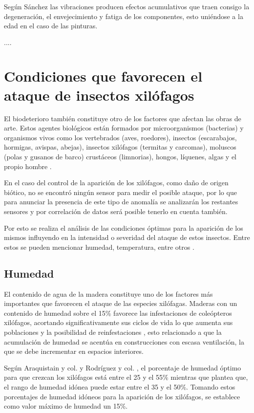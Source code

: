     Según Sánchez \cite{sanchezPinturaSobreTabla2015} las vibraciones producen efectos acumulativos que traen consigo la degeneración, el envejecimiento y fatiga de los componentes, esto uniéndose a la edad en el caso de las pinturas.

    ....


    \section{Condiciones que favorecen el ataque de insectos xilófagos}

    El biodeterioro también constituye otro de los factores que afectan las obras de arte. Estos agentes biológicos están formados por microorganismos (bacterias) y organismos vivos como los vertebrados (aves, roedores), insectos (escarabajos, hormigas, avispas, abejas), insectos xilófagos (termitas y carcomas), moluscos (polas y gusanos de barco) crustáceos (limnorias), hongos, líquenes, algas y el propio hombre \cite{marquezAgentesDeterioroMedioambientales2016}.
    
    En el caso del control de la aparición de los xilófagos, como daño de origen biótico, no se encontró ningún sensor para medir el posible ataque, por lo que para anunciar la presencia de este tipo de anomalía se analizarán los restantes sensores y por correlación de datos será posible tenerlo en cuenta también.
    
    Por esto se realiza el análisis de las condiciones óptimas para la aparición de los mismos influyendo en la intensidad o severidad del ataque de estos insectos. Entre estos se pueden mencionar humedad, temperatura, entre otros \cite{ripa2004termitas}. 
    
    \subsection{Humedad}

    El contenido de agua de la madera constituye uno de los factores más importantes que favorecen el ataque de las especies xilófagas. Maderas con un contenido de humedad sobre el 15\% favorece las infestaciones de coleópteros xilófagos, acortando significativamente sus ciclos de vida lo que aumenta sus poblaciones y la posibilidad de reinfestaciones \cite{ripa2004termitas}, esto relacionado a que la acumulación de humedad se acentúa en construcciones con escasa ventilación, la que se debe incrementar en espacios interiores.

    Según Araquistain y col. \cite{monitoringMoisture} y Rodríguez y col. \cite{rodriguezcodigo}, el porcentaje de humedad óptimo para que crezcan los xilófagos está entre el 25 y el 55\% mientras que \cite{woodPreservation} plantea que, el rango de humedad idónea puede estar entre el 35 y el 50\%. Tomando estos porcentajes de humedad idóneos para la aparición de los xilófagos, se establece como valor máximo de humedad un 15\%.

